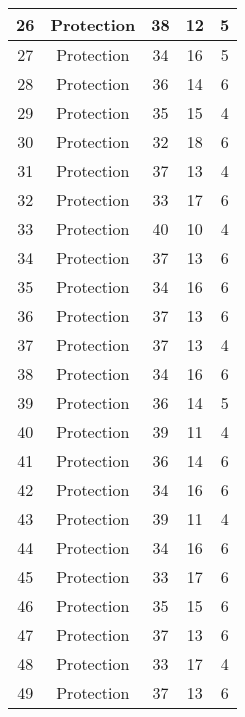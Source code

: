 \documentclass[results.tex]{subfiles}
\begin{document}
\begin{center}
\begin{tabular}{| c || c | c | c | c |}
    \hline
    26 & Protection & 38 & 12 & 5 \\ 
    \hline
    27 & Protection & 34 & 16 & 5 \\ 
    \hline
    28 & Protection & 36 & 14 & 6 \\ 
    \hline
    29 & Protection & 35 & 15 & 4 \\ 
    \hline
    30 & Protection & 32 & 18 & 6 \\ 
    \hline
    31 & Protection & 37 & 13 & 4 \\ 
    \hline
    32 & Protection & 33 & 17 & 6 \\ 
    \hline
    33 & Protection & 40 & 10 & 4 \\ 
    \hline
    34 & Protection & 37 & 13 & 6 \\ 
    \hline
    35 & Protection & 34 & 16 & 6 \\ 
    \hline
    36 & Protection & 37 & 13 & 6 \\ 
    \hline
    37 & Protection & 37 & 13 & 4 \\ 
    \hline
    38 & Protection & 34 & 16 & 6 \\ 
    \hline
    39 & Protection & 36 & 14 & 5 \\ 
    \hline
    40 & Protection & 39 & 11 & 4 \\ 
    \hline
    41 & Protection & 36 & 14 & 6 \\ 
    \hline
    42 & Protection & 34 & 16 & 6 \\ 
    \hline
    43 & Protection & 39 & 11 & 4 \\ 
    \hline
    44 & Protection & 34 & 16 & 6 \\ 
    \hline
    45 & Protection & 33 & 17 & 6 \\ 
    \hline
    46 & Protection & 35 & 15 & 6 \\ 
    \hline
    47 & Protection & 37 & 13 & 6 \\ 
    \hline
    48 & Protection & 33 & 17 & 4 \\ 
    \hline
    49 & Protection & 37 & 13 & 6 \\ 
    \hline   \end{tabular}
\end{center}
\end{document}
